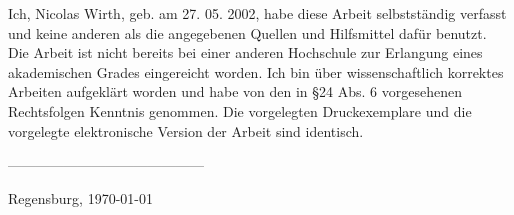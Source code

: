 \documentclass[
  a4paper,
  12pt,
  oneside,
  parskip=half,
  listof=totoc,
  bibliography=totoc,
  DIV=12,
  numbers=noenddot
  ]{scrartcl}
\begin{document}
Ich, Nicolas Wirth, geb. am 27. 05. 2002, habe diese Arbeit selbstständig verfasst und keine anderen als die angegebenen Quellen und Hilfsmittel dafür benutzt. Die Arbeit ist nicht bereits bei einer anderen Hochschule zur Erlangung eines akademischen Grades eingereicht worden. Ich bin über wissenschaftlich korrektes Arbeiten aufgeklärt worden und habe von den in \S 24 Abs. 6 vorgesehenen Rechtsfolgen Kenntnis genommen. Die vorgelegten Druckexemplare und die vorgelegte elektronische Version der Arbeit sind identisch.

\qquad

\qquad

\qquad

\qquad


------------------------------------------

Regensburg, \today
\end{document}
